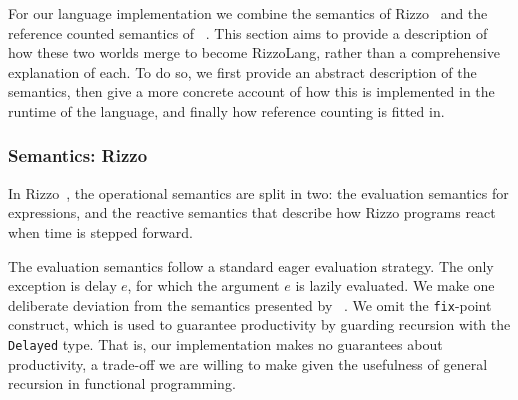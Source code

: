 
For our language implementation we combine the semantics of Rizzo~\cite{rizzo_modal_2025} and the reference counted semantics of \citeauthor*{ullrich_counting_2021}~\cite{ullrich_counting_2021}. This section aims to provide a description of how these two worlds merge to become RizzoLang, rather than a comprehensive explanation of each. 
To do so, we first provide an abstract description of the semantics, then give a more concrete account of how this is implemented in the runtime of the language, and finally how reference counting is fitted in.



\subsubsection{Semantics: Rizzo}

In Rizzo~\cite{rizzo_modal_2025}, the operational semantics are split in two: the evaluation semantics for expressions, and the reactive semantics that describe how Rizzo programs react when time is stepped forward.

The evaluation semantics follow a standard eager evaluation strategy. The only exception is $\text{delay} \; e$, for which the argument $e$ is lazily evaluated.
We make one deliberate deviation from the semantics presented by \citeauthor*{rizzo_modal_2025}~\cite{rizzo_modal_2025}. We omit the \texttt{fix}-point construct, which is used to guarantee productivity by guarding recursion with the \texttt{Delayed} type. That is, our implementation makes no guarantees about productivity, a trade-off we are willing to make given the usefulness of general recursion in functional programming.

